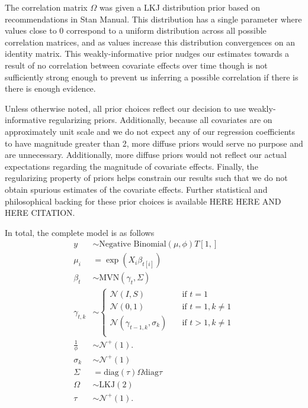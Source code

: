 \documentclass[12pt,letterpaper]{article}
\begin{document}
The correlation matrix \(\Omega\) was given a LKJ distribution prior based on recommendations in Stan Manual. This distribution has a single parameter where values close to 0 correspond to a uniform distribution across all possible correlation matrices, and as values increase this distribution convergences on an identity matrix. This weakly-informative prior nudges our estimates towards a result of no correlation between covariate effects over time though is not sufficiently strong enough to prevent us inferring a possible correlation if there is there is enough evidence.

Unless otherwise noted, all prior choices reflect our decision to use weakly-informative regularizing priors. Additionally, because all covariates are on approximately unit scale and we do not expect any of our regression coefficients to have magnitude greater than 2, more diffuse priors would serve no purpose and are unnecessary. Additionally, more diffuse priors would not reflect our actual expectations regarding the magnitude of covariate effects. Finally, the regularizing property of priors helps constrain our results such that we do not obtain spurious estimates of the covariate effects. Further statistical and philosophical backing for these prior choices is available HERE HERE AND HERE CITATION.

In total, the complete model is as follows
\begin{equation}
  \begin{aligned}
    y &\sim \text{Negative Binomial}(\mu, \phi) T[1, ] \\
    \mu_{i} &= \exp(X_{i} \beta_{t[i]}) \\
    \beta_{t} &\sim \text{MVN}(\gamma_{t}, \Sigma) \\
    \gamma_{t, k} &\sim 
    \begin{cases}
      \mathcal{N}(I, S) & \quad \text{if } t = 1 \\
      \mathcal{N}(0, 1) & \quad \text{if } t = 1, k \neq 1 \\
      \mathcal{N}(\gamma_{t - 1, k}, \sigma_{k}) & \quad \text{if } t > 1, k \neq 1 \\
    \end{cases} \\
    \frac{1}{\phi} &\sim \mathcal{N}^{+}(1). \\
    \sigma_{k} &\sim \mathcal{N}^{+}(1) \\ 
    \Sigma &= \text{diag}(\tau) \Omega \text{diag}{\tau} \\
    \Omega &\sim \text{LKJ}(2) \\
    \tau &\sim \mathcal{N}^{+}(1). \\
  \end{aligned}
  \label{eq:complete}
\end{equation}
\end{document}
